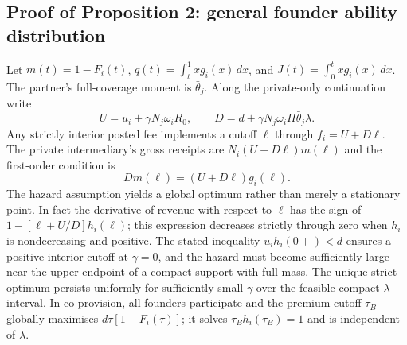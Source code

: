 \subsection{Proof of Proposition 2: general founder ability distribution}
Let $m(t)=1-F_i(t)$, $q(t)=\int_t^1xg_i(x)\,dx$, and
$J(t)=\int_0^t xg_i(x)\,dx$. The partner's full-coverage moment is
$\bar\theta_j$. Along the private-only continuation write
\[
 U=u_i+\gamma N_j\omega_iR_0,
 \qquad D=d+\gamma N_j\omega_i\Pi\bar\theta_j\lambda.
\]
Any strictly interior posted fee implements a cutoff $\ell$
through $f_i=U+D\ell$. The private intermediary's gross receipts are
$N_i(U+D\ell)m(\ell)$ and the first-order condition is
\begin{equation}
 Dm(\ell)=(U+D\ell)g_i(\ell).
 \label{eq:general-fee-foc}
\end{equation}
The hazard assumption yields a global optimum rather than merely a
stationary point. In fact the derivative of revenue with respect to
$\ell$ has the sign of
$1-[\ell+U/D]h_i(\ell)$; this expression decreases
strictly through zero when $h_i$ is nondecreasing and positive.
The stated inequality $u_i h_i(0+)<d$ ensures a positive interior
cutoff at $\gamma=0$, and the hazard must become sufficiently large
near the upper endpoint of a compact support with full mass.
The unique strict optimum persists uniformly for sufficiently small
$\gamma$ over the feasible compact $\lambda$ interval.
In co-provision, all founders participate and the premium cutoff
$\tau_B$ globally maximises $d\tau[1-F_i(\tau)]$;
it solves $\tau_Bh_i(\tau_B)=1$ and is independent of $\lambda$.

